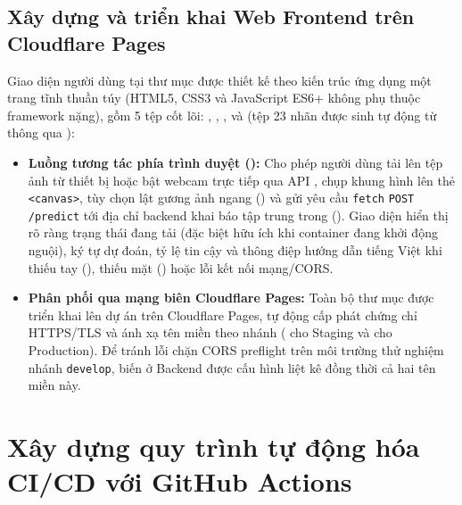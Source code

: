 \subsection{Xây dựng và triển khai Web Frontend trên Cloudflare Pages}
\label{subsec:cloudflare_pages}

Giao diện người dùng tại thư mục  được thiết kế theo kiến trúc ứng dụng một trang tĩnh thuần túy (HTML5, CSS3 và JavaScript ES6+ không phụ thuộc framework nặng), gồm 5 tệp cốt lõi: , , ,  và  (tệp 23 nhãn được sinh tự động từ  thông qua ):
\begin{itemize}
    \item \textbf{Luồng tương tác phía trình duyệt ():} Cho phép người dùng tải lên tệp ảnh từ thiết bị hoặc bật webcam trực tiếp qua API , chụp khung hình lên thẻ \texttt{<canvas>}, tùy chọn lật gương ảnh ngang () và gửi yêu cầu \texttt{fetch} \texttt{POST /predict} tới địa chỉ backend khai báo tập trung trong  (). Giao diện hiển thị rõ ràng trạng thái đang tải (đặc biệt hữu ích khi container đang khởi động nguội), ký tự dự đoán, tỷ lệ tin cậy và thông điệp hướng dẫn tiếng Việt khi thiếu tay (), thiếu mặt () hoặc lỗi kết nối mạng/CORS.
    \item \textbf{Phân phối qua mạng biên Cloudflare Pages:} Toàn bộ thư mục  được triển khai lên dự án  trên Cloudflare Pages, tự động cấp phát chứng chỉ HTTPS/TLS và ánh xạ tên miền theo nhánh ( cho Staging và  cho Production). Để tránh lỗi chặn CORS preflight trên môi trường thử nghiệm nhánh \texttt{develop}, biến  ở Backend được cấu hình liệt kê đồng thời cả hai tên miền này.
\end{itemize}

\section{Xây dựng quy trình tự động hóa CI/CD với GitHub Actions}
\label{sec:quy_trinh_cicd}

